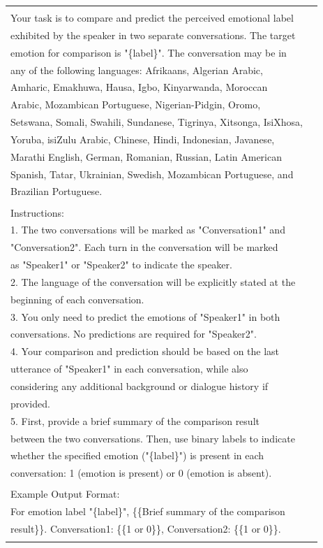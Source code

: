 \documentclass[11pt]{article}
\begin{document}
\begin{table}[]
\begin{tabular}{l|l}
\begin{tabular}[c]{@{}l@{}}Task Description: \\ Your task is to compare and predict the perceived emotional label \\ exhibited by the speaker in two separate conversations. The target \\ emotion for comparison is "\{label\}". The conversation may be in \\ any of the following languages: Afrikaans, Algerian Arabic, \\ Amharic, Emakhuwa, Hausa, Igbo, Kinyarwanda, Moroccan \\ Arabic, Mozambican Portuguese, Nigerian-Pidgin, Oromo, \\ Setswana, Somali, Swahili, Sundanese, Tigrinya, Xitsonga, IsiXhosa, \\ Yoruba, isiZulu Arabic, Chinese, Hindi, Indonesian, Javanese, \\ Marathi English, German, Romanian, Russian, Latin American \\ Spanish, Tatar, Ukrainian, Swedish, Mozambican Portuguese, and \\ Brazilian Portuguese. \\ \\ Instructions: \\ 1. The two conversations will be marked as "Conversation1" and \\ "Conversation2". Each turn in the conversation will be marked \\ as "Speaker1" or "Speaker2" to indicate the speaker. \\ 2. The language of the conversation will be explicitly stated at the \\ beginning of each conversation. \\ 3. You only need to predict the emotions of "Speaker1" in both \\ conversations. No predictions are required for "Speaker2". \\ 4. Your comparison and prediction should be based on the last \\ utterance of "Speaker1" in each conversation, while also \\ considering any additional background or dialogue history if \\ provided. \\ 5. First, provide a brief summary of the comparison result \\ between the two conversations. Then, use binary labels to indicate \\ whether the specified emotion ("\{label\}") is present in each \\ conversation: 1 (emotion is present) or 0 (emotion is absent). \\ \\ Example Output Format: \\ For emotion label "\{label\}", \{\{Brief summary of the comparison \\ result\}\}. Conversation1: \{\{1 or 0\}\}, Conversation2: \{\{1 or 0\}\}. \\ \\ 
\end{tabular}
\end{table}
\end{document}
